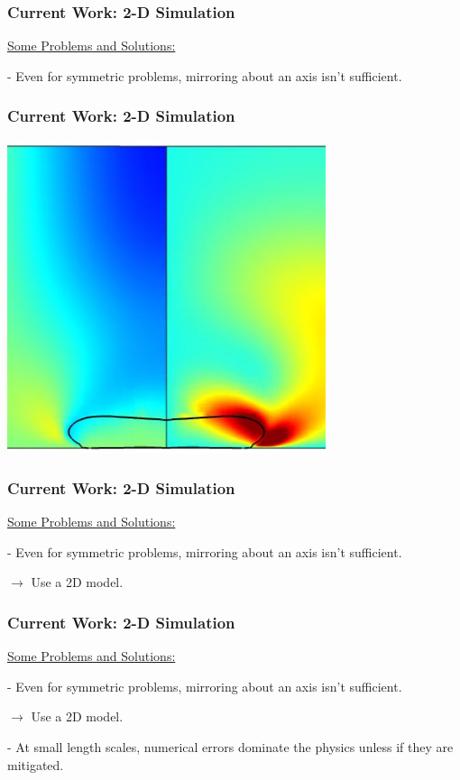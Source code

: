 \documentclass[12pt]{beamer}
\begin{document}
\begin{frame}
    \frametitle{Current Work: 2-D Simulation}
    \underline{Some Problems and Solutions:}

    - Even for symmetric problems, mirroring about an axis isn't sufficient.
\end{frame}
\begin{frame}
    \frametitle{Current Work: 2-D Simulation}

    \includegraphics[width=0.7\textwidth]{img/11-pillowing.png}
\end{frame}
\begin{frame}
    \frametitle{Current Work: 2-D Simulation}
    \underline{Some Problems and Solutions:}

    - Even for symmetric problems, mirroring about an axis isn't sufficient.

    $\rightarrow$ Use a 2D model.
\end{frame}
\begin{frame}
    \frametitle{Current Work: 2-D Simulation}
    \underline{Some Problems and Solutions:}

    - Even for symmetric problems, mirroring about an axis isn't sufficient.

    $\rightarrow$ Use a 2D model.

    - At small length scales, numerical errors dominate the physics unless if 
    they are mitigated.
\end{frame}
\end{document}
